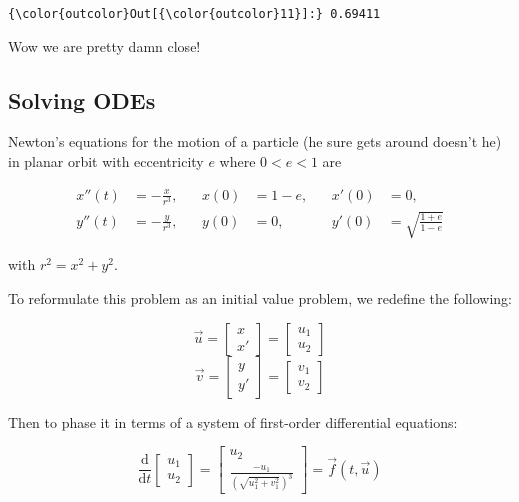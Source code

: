 \documentclass[11pt]{article}
\begin{document}
\begin{Verbatim}[commandchars=\\\{\}]
{\color{outcolor}Out[{\color{outcolor}11}]:} 0.69411
\end{Verbatim}
            
    Wow we are pretty damn close!

    \subsection{Solving ODEs}\label{solving-odes}

    Newton's equations for the motion of a particle (he sure gets around
doesn't he) in planar orbit with eccentricity \(e\) where \(0 < e < 1\)
are

\[\begin{aligned}
    x''(t) &= -\frac{x}{r^3}, ~~~~ &x(0) &= 1 - e, ~~~~ &x'(0) &= 0, \\
    y''(t) &= -\frac{y}{r^3}, ~~~~ &y(0) &= 0, ~~~~ &y'(0) &= \sqrt{\frac{1 + e}{1 - e}}
\end{aligned}\]

with \(r^2 = x^2 + y^2.\)

    To reformulate this problem as an initial value problem, we redefine the
following:

\[\vec{u} = \begin{bmatrix} x \\ x' \end{bmatrix} = \begin{bmatrix} u_1 \\ u_2 \end{bmatrix}\]
\[\vec{v} = \begin{bmatrix} y \\ y' \end{bmatrix} = \begin{bmatrix} v_1 \\ v_2 \end{bmatrix}\]

Then to phase it in terms of a system of first-order differential
equations:

\[\frac{\text{d}}{\text{d}t} \begin{bmatrix} u_1 \\ u_2 \end{bmatrix} = \begin{bmatrix} u_2 \\ \frac{-u_1}{(\sqrt{u_1^2 + v_1^2})^{ 3}} \end{bmatrix} = \vec{f}(t, \vec{u})\]
\end{document}
